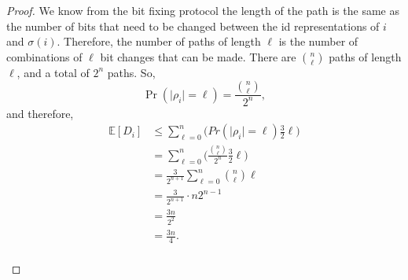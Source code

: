 \documentclass[psamsfonts, 10pt]{amsart}
\newtheorem{thm}{Theorem}[section]
\theoremstyle{definition}
\theoremstyle{remark}
\numberwithin{equation}{section}
\newcommand{\E}{\mathbb{E}}
\newcommand{\creturn}{\mbox{}\\}
\begin{document}
\begin{proof}
We know from the bit fixing protocol the length of the path is the same as the number of bits that need to be changed between the id representations of $i$ and $\sigma(i)$. Therefore, the number of paths of length $\ell$ is the number of combinations of $\ell$ bit changes that can be made. There are $\binom{n}{\ell}$ paths of length $\ell$, and a total of $2^n$ paths. So,
\begin{equation*}
\Pr(\lvert \rho_i \rvert = \ell) = \frac{\binom{n}{\ell}}{2^n},
\end{equation*}
and therefore,
\begin{equation}
\begin{aligned}
\E[D_i] &\leq \sum_{\ell= 0}^n\bigg(Pr(\lvert \rho_i \rvert = \ell )\frac{3}{2}\ell\bigg)\\
&= \sum_{\ell= 0}^n\bigg(\frac{\binom{n}{\ell}}{2^n}\frac{3}{2}\ell\bigg)\\
&=\frac{3}{2^{n+1}}\sum_{\ell=0}^n\binom{n}{\ell}\ell\\
&= \frac{3}{2^{n+1}}\cdot n2^{n-1}\\
&= \frac{3n}{2^2}\\
&=\frac{3n}{4}.
\end{aligned}
\end{equation}
\creturn
\end{proof}



\iffalse
\begin{thm}
Let $\mathcal{S}$ be the total number of time steps required to route all packets from $i$ to $\sigma(i)$. Then $\E[\mathcal{S}] \leq 2^{n-2}5n$
\end{thm}

\begin{proof}

Let $\mathcal{S}_i$ be the total number of time steps required to route packet $v_i$ from $i$ to $\sigma(i)$. Then
\[
\E[\mathcal{S}] = \sum_{i = 0}^{n-1} \E[\mathcal{S}_i]
\]

Furthermore, the total number of steps required to route a packet is the length of the path plus the delay incurred on the path, so
\[
\E[\mathcal{S}_i] = \E[\lvert \rho_i \rvert ] + \E[D_i] \leq \frac{5n}{4}
\]
and therefore
\begin{equation}
\E[\mathcal{S}] \leq 2^n\frac{5n}{4} = 2^{n-2}5n
\end{equation}
\end{proof}
\fi
\end{document}
